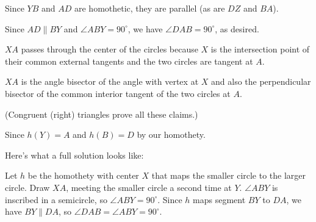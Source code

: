 

Since $YB$ and $AD$ are homothetic, they are parallel (as are $DZ$ and $BA$).

Since $AD \parallel BY$ and $\angle ABY = 90^\circ$, we have $\angle DAB = 90^\circ$, as desired.





$XA$ passes through the center of the circles because $X$ is the intersection point of their common external tangents and the two circles are tangent at  $A$.

$XA$ is the angle bisector of the angle with vertex at  $X$ and also the perpendicular bisector of the common interior tangent of the two circles at $A$.

(Congruent (right) triangles prove all these claims.)


Since $h(Y)=A$ and $h(B)=D$ by our homothety.

Here's what a full solution looks like:

Let $h$ be the homothety with center $X$ that maps the smaller circle to the larger circle. Draw $XA$, meeting the smaller circle a second time at $Y$. $\angle ABY$ is inscribed in a semicircle, so $\angle ABY = 90^\circ$. Since $h$ maps segment $BY$ to $DA$, we have $BY \parallel DA$, so $\angle DAB = \angle ABY = 90^\circ$.


